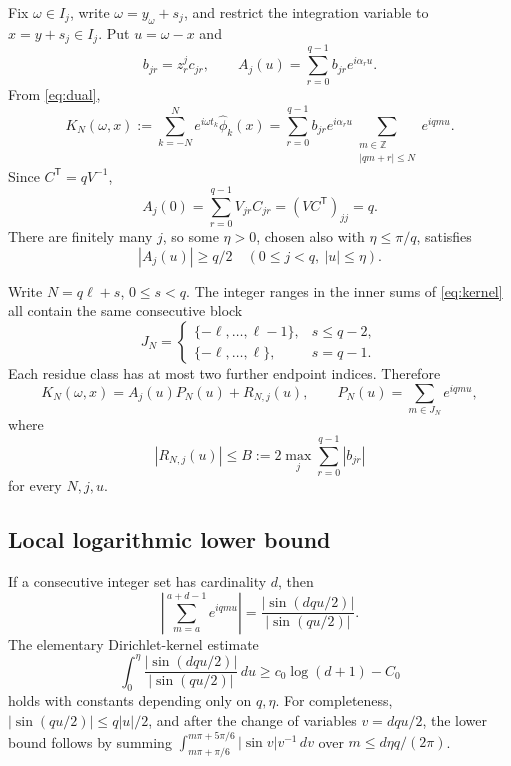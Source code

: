 \documentclass[11pt]{article}
\begin{document}
Fix \(\omega\in I_j\), write \(\omega=y_\omega+s_j\), and restrict the
integration variable to \(x=y+s_j\in I_j\).  Put \(u=\omega-x\) and
\[
 b_{jr}=z_r^jc_{jr},\qquad
 A_j(u)=\sum_{r=0}^{q-1}b_{jr}e^{i\alpha_ru}.
\]
From \eqref{eq:dual},
\begin{equation}\label{eq:kernel}
 K_N(\omega,x):=\sum_{k=-N}^{N}
 e^{i\omega t_k}\widehat\phi_k(x)
 =
 \sum_{r=0}^{q-1}b_{jr}e^{i\alpha_ru}
 \sum_{\substack{m\in\mathbb Z\\|qm+r|\leq N}}e^{iqmu}.
\end{equation}
Since \(C^{\mathsf T}=qV^{-1}\),
\[
 A_j(0)=\sum_{r=0}^{q-1}V_{jr}C_{jr}
 =(VC^{\mathsf T})_{jj}=q.
\]
There are finitely many \(j\), so some \(\eta>0\), chosen also with
\(\eta\leq\pi/q\), satisfies
\begin{equation}\label{eq:Aaway}
 |A_j(u)|\geq q/2
 \quad(0\leq j<q,\ |u|\leq\eta).
\end{equation}

Write \(N=q\ell+s\), \(0\leq s<q\).  The integer ranges in the inner sums
of \eqref{eq:kernel} all contain the same consecutive block
\[
 J_N=
 \begin{cases}
 \{-\ell,\ldots,\ell-1\},&s\leq q-2,\\
 \{-\ell,\ldots,\ell\},&s=q-1.
 \end{cases}
\]
Each residue class has at most two further endpoint indices.  Therefore
\begin{equation}\label{eq:decomp}
 K_N(\omega,x)=A_j(u)P_N(u)+R_{N,j}(u),
 \qquad
 P_N(u)=\sum_{m\in J_N}e^{iqmu},
\end{equation}
where
\begin{equation}\label{eq:R}
 |R_{N,j}(u)|\leq
 B:=2\max_j\sum_{r=0}^{q-1}|b_{jr}|
\end{equation}
for every \(N,j,u\).

\subsection*{Local logarithmic lower bound}

If a consecutive integer set has cardinality \(d\), then
\[
 \left|\sum_{m=a}^{a+d-1}e^{iqmu}\right|
 =\frac{|\sin(dqu/2)|}{|\sin(qu/2)|}.
\]
The elementary Dirichlet-kernel estimate
\begin{equation}\label{eq:Dir}
 \int_0^\eta
 \frac{|\sin(dqu/2)|}{|\sin(qu/2)|}\,du
 \geq c_0\log(d+1)-C_0
\end{equation}
holds with constants depending only on \(q,\eta\).  For completeness,
\(|\sin(qu/2)|\leq q|u|/2\), and after the change of variables
\(v=dqu/2\), the lower bound follows by summing
\(\int_{m\pi+\pi/6}^{m\pi+5\pi/6}|\sin v|v^{-1}\,dv\)
over \(m\leq d\eta q/(2\pi)\).
\end{document}
